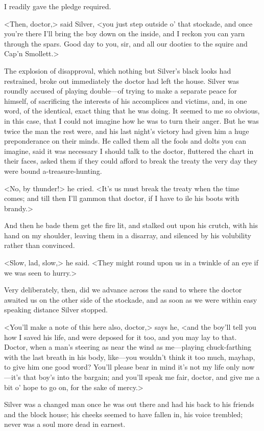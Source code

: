 I readily gave the pledge required.

<Then, doctor,> said Silver, <you just step outside o' that stockade, and once you're there I'll bring the boy down on the inside, and I reckon you can yarn through the spars. Good day to you, sir, and all our dooties to the squire and Cap'n Smollett.>

The explosion of disapproval, which nothing but Silver's black looks had restrained, broke out immediately the doctor had left the house. Silver was roundly accused of playing double—of trying to make a separate peace for himself, of sacrificing the interests of his accomplices and victims, and, in one word, of the identical, exact thing that he was doing. It seemed to me so obvious, in this case, that I could not imagine how he was to turn their anger. But he was twice the man the rest were, and his last night's victory had given him a huge preponderance on their minds. He called them all the fools and dolts you can imagine, said it was necessary I should talk to the doctor, fluttered the chart in their faces, asked them if they could afford to break the treaty the very day they were bound a-treasure-hunting.

<No, by thunder!> he cried. <It's us must break the treaty when the time comes; and till then I'll gammon that doctor, if I have to ile his boots with brandy.>

And then he bade them get the fire lit, and stalked out upon his crutch, with his hand on my shoulder, leaving them in a disarray, and silenced by his volubility rather than convinced.

<Slow, lad, slow,> he said. <They might round upon us in a twinkle of an eye if we was seen to hurry.>

Very deliberately, then, did we advance across the sand to where the doctor awaited us on the other side of the stockade, and as soon as we were within easy speaking distance Silver stopped.

<You'll make a note of this here also, doctor,> says he, <and the boy'll tell you how I saved his life, and were deposed for it too, and you may lay to that. Doctor, when a man's steering as near the wind as me—playing chuck-farthing with the last breath in his body, like—you wouldn't think it too much, mayhap, to give him one good word? You'll please bear in mind it's not my life only now—it's that boy's into the bargain; and you'll speak me fair, doctor, and give me a bit o' hope to go on, for the sake of mercy.>

Silver was a changed man once he was out there and had his back to his friends and the block house; his cheeks seemed to have fallen in, his voice trembled; never was a soul more dead in earnest.

